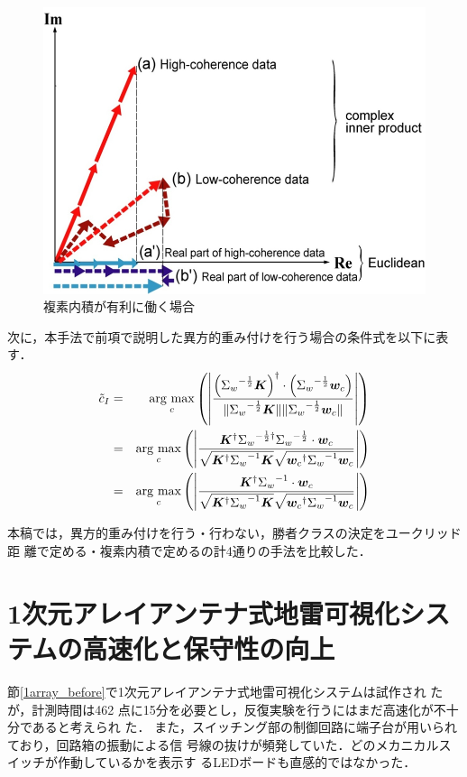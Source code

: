 ﻿\documentclass[12pt,oneside]{jsbook}
\newcommand{\argmax}{\mathop{\rm arg~max}\limits}
\begin{document}
\begin{figure}[btp]
 \begin{center}
\includegraphics[width =0.6\hsize ]{innerproduct.png}
\caption{複素内積が有利に働く場合}
\label{ip}
  \end{center}
\end{figure}

次に，本手法で前項で説明した異方的重み付けを行う場合の条件式を以下に表す．
\begin{eqnarray}
\tilde{c}_I &=& \argmax_{c} \left( \left|
\frac{\left({\Sigma_w}^{-\frac{1}{2}}{\bm K}\right)^{\dagger}\cdot
\left({\Sigma_w}^{-\frac{1}{2}}{\bm w_c}\right)
}{ \|{\Sigma_w}^{-\frac{1}{2}}{\bm K}\| \|{\Sigma_w}^{-\frac{1}{2}}{\bm w_c} \| }
                                   \right| \right)\\
 &=& \argmax_{c} \left( \left|
\frac{{\bm K}^{\dagger}{\Sigma_w}^{-\frac{1}{2}
\dagger}{\Sigma_w}^{-\frac{1}{2}}\cdot{\bm w_c}
}{ \sqrt{{\bm K}^{\dagger}{\Sigma_w}^{-1}{\bm K}}\sqrt{{\bm
w_c}^{\dagger}{\Sigma_w}^{-1}{\bm w_c}} }
                                   \right| \right)\\
 &=& \argmax_{c} \left( \left|
\frac{{\bm K}^{\dagger}{\Sigma_w}^{-1}\cdot{\bm w_c}
}{ \sqrt{{\bm K}^{\dagger}{\Sigma_w}^{-1}{\bm K}}\sqrt{{\bm
w_c}^{\dagger}{\Sigma_w}^{-1}{\bm w_c}} }
                                   \right| \right)
\end{eqnarray}

本稿では，異方的重み付けを行う・行わない，勝者クラスの決定をユークリッド距
離で定める・複素内積で定めるの計4通りの手法を比較した．
\section{1次元アレイアンテナ式地雷可視化システムの高速化と保守性の向上}
節\ref{1array_before}で1次元アレイアンテナ式地雷可視化システムは試作され
たが，計測時間は462
点に15分を必要とし，反復実験を行うにはまだ高速化が不十分であると考えられ
た．
また，スイッチング部の制御回路に端子台が用いられており，回路箱の振動による信
号線の抜けが頻発していた．どのメカニカルスイッチが作動しているかを表示す
るLEDボードも直感的ではなかった．
\end{document}
